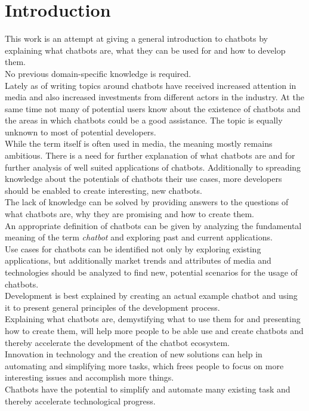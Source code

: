 \chapter{Introduction}

This work is an attempt at giving a general introduction to chatbots
by explaining what chatbots are, what they can be used for and how to develop them.
\\
No previous domain-specific knowledge is required.
\\

Lately as of writing topics around chatbots have received increased attention in media and also increased investments from different actors in the industry.
At the same time not many of potential users know about the existence of chatbots and the areas in which chatbots could be a good assistance.
The topic is equally unknown to most of potential developers.
\\
While the term itself is often used in media, the meaning mostly remains ambitious.
There is a need for further explanation of what chatbots are and for further analysis of well suited applications of chatbots.
Additionally to spreading knowledge about the potentials of chatbots their use cases,
more developers should be enabled to create interesting, new chatbots.
\\

The lack of knowledge can be solved by providing answers to the questions of what chatbots are, why they are promising and how to create them.
\\
An appropriate definition of chatbots can be given by analyzing the fundamental meaning of the term \emph{chatbot} and exploring past and current applications.
\\
Use cases for chatbots can be identified not only by exploring existing applications, but additionally market trends and attributes of media and technologies should be analyzed to find new, potential scenarios for the usage of chatbots.
\\
Development is best explained by creating an actual example chatbot and using it to present general principles of the development process.
\\

Explaining what chatbots are, demystifying what to use them for and presenting how to create them,
will help more people to be able use and create chatbots and thereby accelerate the development of the chatbot ecosystem.
\\
Innovation in technology and the creation of new solutions can help in automating and simplifying more tasks,
which frees people to focus on more interesting issues and accomplish more things.
\\
Chatbots have the potential to simplify and automate many existing task and thereby accelerate technological progress.
\\

